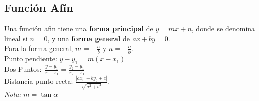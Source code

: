 \subsection{Función Afín}
Una función afin tiene una \textbf{forma principal} de $y = mx + n$, donde se denomina lineal si $n=0$, y una \textbf{forma general} de $ax + by = 0$.\\
Para la forma general, $m = -\frac{a}{b}$ y $n = -\frac{c}{b}.$\\
Punto pendiente: $y - y_1 = m(x - x_1)$\\
Dos Puntos: $\frac{y-y_1}{x-x_1} = \frac{y_2-y_1}{x_2-x_1}$\\
Distancia punto-recta: $\frac{|ax_0+by_0+c|}{\sqrt{a^2+b^2}}.$\\
\textit{Nota:} $m = \tan \alpha$